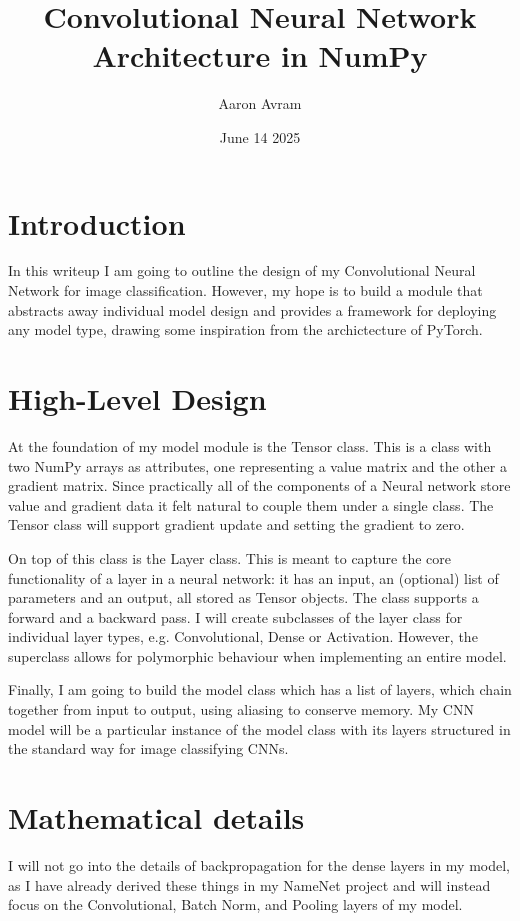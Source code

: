 \documentclass[12pt]{article}
\title{Convolutional Neural Network Architecture in NumPy}
\author{Aaron Avram}
\date{June 14 2025}
\begin{document}
\maketitle

\section*{Introduction}
In this writeup I am going to outline the design of my Convolutional Neural Network for image classification.
However, my hope is to build a module that abstracts away individual model design and provides a framework
for deploying any model type, drawing some inspiration from the archictecture of PyTorch.

\section*{High-Level Design}
At the foundation of my model module is the Tensor class. This is a class with two NumPy arrays as attributes,
one representing a value matrix and the other a gradient matrix. Since practically all of the components of a Neural
network store value and gradient data it felt natural to couple them under a single class. The Tensor class will support
gradient update and setting the gradient to zero.


On top of this class is the Layer class. This is meant to capture the core functionality of a layer in a neural network:
it has an input, an (optional) list of parameters and an output, all stored as Tensor objects. The class supports a forward 
and a backward pass. I will create subclasses of the layer class for individual layer types, e.g.
Convolutional, Dense or Activation. However, the superclass allows for polymorphic 
behaviour when implementing an entire model.


Finally, I am going to build the model class which has a list of layers, which chain together from input to output, using
aliasing to conserve memory. My CNN model will be a particular instance of the model class with its layers structured
in the standard way for image classifying CNNs.

\section*{Mathematical details}
I will not go into the details of backpropagation for the dense layers in
my model, as I have already derived these things in my NameNet project and will
instead focus on the Convolutional, Batch Norm, and Pooling layers of my model.
\end{document}

